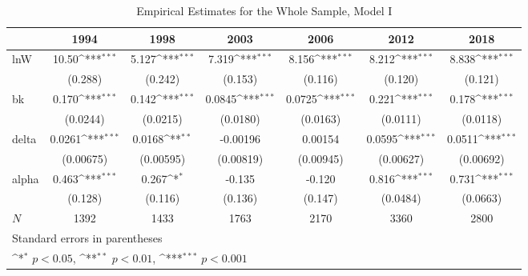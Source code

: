 \documentclass[12pt,a4paper]{article}
\begin{document}
\begin{table}[h!]\centering
	\def\sym#1{\ifmmode^{#1}\else\(^{#1}\)\fi}
	\caption{Empirical Estimates for the Whole Sample, Model I}
	\begin{tabular}{l*{6}{c}}
		\hline\hline
		&\multicolumn{1}{c}{1994}&\multicolumn{1}{c}{1998}&\multicolumn{1}{c}{2003}&\multicolumn{1}{c}{2006}&\multicolumn{1}{c}{2012}&\multicolumn{1}{c}{2018}\\
		\hline
		lnW      &       10.50\sym{***}&       5.127\sym{***}&       7.319\sym{***}&       8.156\sym{***}&       8.212\sym{***}&       8.838\sym{***}\\
		&     (0.288)         &     (0.242)         &     (0.153)         &     (0.116)         &     (0.120)         &     (0.121)         \\
		\hline
		bk       &       0.170\sym{***}&       0.142\sym{***}&      0.0845\sym{***}&      0.0725\sym{***}&       0.221\sym{***}&       0.178\sym{***}\\
		&    (0.0244)         &    (0.0215)         &    (0.0180)         &    (0.0163)         &    (0.0111)         &    (0.0118)         \\
		\hline
		delta      &      0.0261\sym{***}&      0.0168\sym{**} &    -0.00196         &     0.00154         &      0.0595\sym{***}&      0.0511\sym{***}\\
		&   (0.00675)         &   (0.00595)         &   (0.00819)         &   (0.00945)         &   (0.00627)         &   (0.00692)         \\
		\hline
		alpha       &       0.463\sym{***}&       0.267\sym{*}  &      -0.135         &      -0.120         &       0.816\sym{***}&       0.731\sym{***}\\
		&     (0.128)         &     (0.116)         &     (0.136)         &     (0.147)         &    (0.0484)         &    (0.0663)         \\
		\hline
		\(N\)       &        1392         &        1433         &        1763         &        2170         &        3360         &        2800         \\
		\hline\hline
		\multicolumn{7}{l}{\footnotesize Standard errors in parentheses}\\
		\multicolumn{7}{l}{\footnotesize \sym{*} \(p<0.05\), \sym{**} \(p<0.01\), \sym{***} \(p<0.001\)}\\
	\end{tabular}
\end{table}
\end{document}
